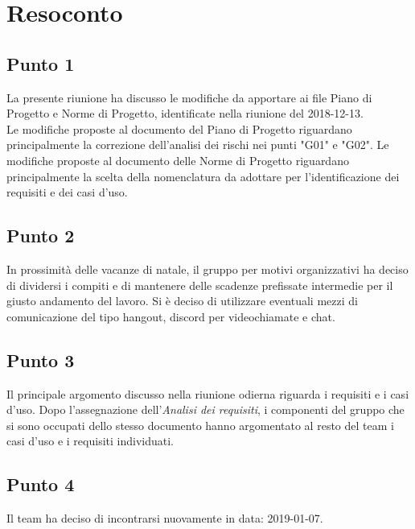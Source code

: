 \section{Resoconto}

\subsection{Punto 1}
La presente riunione ha discusso le modifiche da apportare ai file Piano di Progetto e Norme di Progetto, identificate nella riunione del 2018-12-13.\\
Le modifiche proposte al documento del Piano di Progetto riguardano principalmente la correzione dell'analisi dei rischi nei punti "G01" e "G02". 
Le modifiche proposte al documento delle Norme di Progetto riguardano principalmente la scelta della nomenclatura da adottare per l'identificazione dei requisiti e dei casi d'uso.

\subsection{Punto 2}
In prossimità delle vacanze di natale, il gruppo per motivi organizzativi ha deciso di dividersi i compiti e di mantenere delle scadenze prefissate intermedie per il giusto andamento del lavoro. Si è deciso di utilizzare eventuali mezzi di comunicazione del tipo hangout, discord per videochiamate e chat.

\subsection{Punto 3}
Il principale argomento discusso nella riunione odierna riguarda i requisiti e i casi d'uso. Dopo l'assegnazione dell'\textit{Analisi dei requisiti}, i componenti del gruppo che si sono occupati dello stesso documento hanno argomentato al resto del team i casi d'uso e i requisiti individuati.

\subsection{Punto 4}
Il team ha deciso di incontrarsi nuovamente in data: 2019-01-07.
